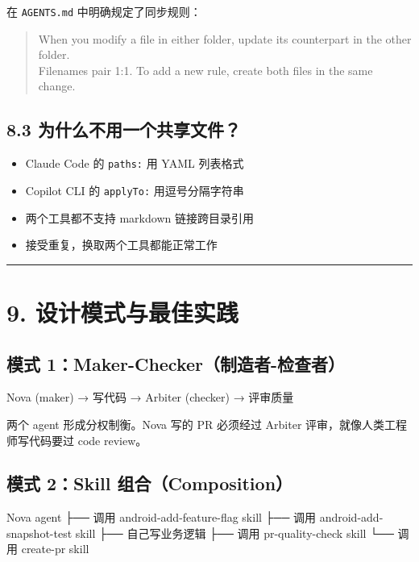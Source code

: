 在 \texttt{AGENTS.md} 中明确规定了同步规则：


\begin{quote}
When you modify a file in either folder, update its counterpart in the other folder.\\
Filenames pair 1:1. To add a new rule, create both files in the same change.\\
\end{quote}

\subsection{8.3 为什么不用一个共享文件？}

\begin{itemize}[leftmargin=2em]
\item Claude Code 的 \texttt{paths:} 用 YAML 列表格式
\item Copilot CLI 的 \texttt{applyTo:} 用逗号分隔字符串
\item 两个工具都不支持 markdown 链接跨目录引用
\item 接受重复，换取两个工具都能正常工作
\end{itemize}

\bigskip\hrule\bigskip

\section{9. 设计模式与最佳实践}

\subsection{模式 1：Maker-Checker（制造者-检查者）}

\begin{codeblock}
Nova (maker) → 写代码 → Arbiter (checker) → 评审质量
\end{codeblock}

两个 agent 形成分权制衡。Nova 写的 PR 必须经过 Arbiter 评审，就像人类工程师写代码要过 code review。


\subsection{模式 2：Skill 组合（Composition）}

\begin{codeblock}
Nova agent
  ├── 调用 android-add-feature-flag skill
  ├── 调用 android-add-snapshot-test skill
  ├── 自己写业务逻辑
  ├── 调用 pr-quality-check skill
  └── 调用 create-pr skill
\end{codeblock}

